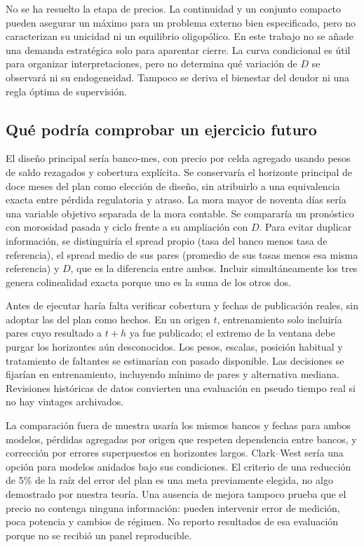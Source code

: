 \documentclass[11pt]{article}
\theoremstyle{definition}\newtheorem{assumption}{Supuesto}
\begin{document}
No se ha resuelto la etapa de precios. La continuidad y un conjunto compacto
pueden asegurar un máximo para un problema externo bien especificado, pero
no caracterizan su unicidad ni un equilibrio oligopólico. En este trabajo no
se añade una demanda estratégica solo para aparentar cierre. La curva
condicional es útil para organizar interpretaciones, pero no determina qué
variación de $D$ se observará ni su endogeneidad. Tampoco se deriva el bienestar
del deudor ni una regla óptima de supervisión.

\subsection{Qué podría comprobar un ejercicio futuro}
El diseño principal sería banco-mes, con precio por celda agregado usando
pesos de saldo rezagados y cobertura explícita. Se conservaría el horizonte
principal de doce meses del plan como elección de diseño, sin atribuirlo a
una equivalencia exacta entre pérdida regulatoria y atraso. La mora mayor de
noventa días sería una variable objetivo separada de la mora contable.
Se compararía un pronóstico con morosidad pasada y ciclo frente a su ampliación
con $D$. Para evitar duplicar información, se distinguiría el spread propio
(tasa del banco menos tasa de referencia), el spread medio de sus pares
(promedio de sus tasas menos esa misma referencia) y $D$, que es la
diferencia entre ambos. Incluir simultáneamente los tres genera
colinealidad exacta porque uno es la suma de los otros dos.

Antes de ejecutar haría falta verificar cobertura y fechas de publicación
reales, sin adoptar las del plan como hechos. En un origen $t$, entrenamiento
solo incluiría pares cuyo resultado a $t+h$ ya fue publicado; el extremo de
la ventana debe purgar los horizontes aún desconocidos. Los pesos, escalas,
posición habitual y tratamiento de faltantes se estimarían con pasado
disponible. Las decisiones se fijarían en entrenamiento, incluyendo mínimo
de pares y alternativa mediana. Revisiones históricas de datos convierten una
evaluación en pseudo tiempo real si no hay vintages archivados.

La comparación fuera de muestra usaría los mismos bancos y fechas para ambos
modelos, pérdidas agregadas por origen que respeten dependencia entre bancos,
y corrección por errores superpuestos en horizontes largos. Clark--West sería
una opción para modelos anidados bajo sus condiciones. El criterio de una
reducción de 5\% de la raíz del error del plan es una meta previamente elegida,
no algo demostrado por nuestra teoría. Una ausencia de mejora tampoco prueba
que el precio no contenga ninguna información: pueden intervenir error de
medición, poca potencia y cambios de régimen. No reporto resultados de esa
evaluación porque no se recibió un panel reproducible.
\end{document}
